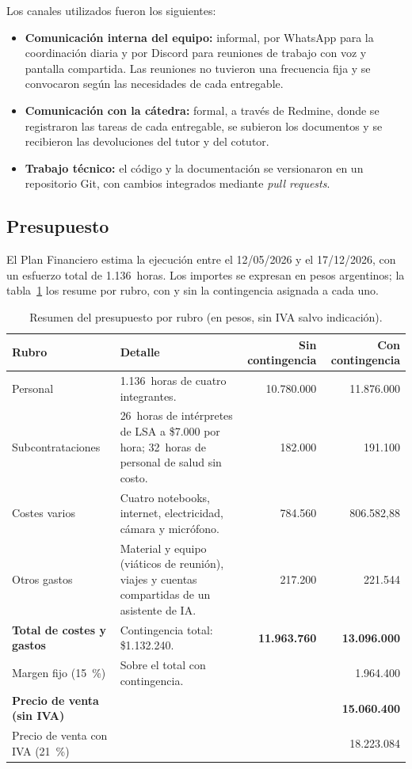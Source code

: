 Los canales utilizados fueron los siguientes:
\begin{itemize}
  \item \textbf{Comunicación interna del equipo:} informal, por WhatsApp para la coordinación diaria y por Discord para reuniones de trabajo con voz y pantalla compartida. Las reuniones no tuvieron una frecuencia fija y se convocaron según las necesidades de cada entregable.
  \item \textbf{Comunicación con la cátedra:} formal, a través de Redmine, donde se registraron las tareas de cada entregable, se subieron los documentos y se recibieron las devoluciones del tutor y del cotutor.
  \item \textbf{Trabajo técnico:} el código y la documentación se versionaron en un repositorio Git, con cambios integrados mediante \emph{pull requests}.
\end{itemize}

\subsection{Presupuesto}

El Plan Financiero estima la ejecución entre el 12/05/2026 y el 17/12/2026, con un esfuerzo total de 1.136~horas. Los importes se expresan en pesos argentinos; la tabla~\ref{tab:presupuesto} los resume por rubro, con y sin la contingencia asignada a cada uno.

\begin{table}[htbp]
\centering
\caption{Resumen del presupuesto por rubro (en pesos, sin IVA salvo indicación).}\label{tab:presupuesto}
\footnotesize
\begin{tabularx}{\textwidth}{@{}p{3.0cm}Xrr@{}}
\toprule
\textbf{Rubro} & \textbf{Detalle} & \textbf{Sin contingencia} & \textbf{Con contingencia} \\
\midrule
Personal & 1.136~horas de cuatro integrantes. & 10.780.000 & 11.876.000 \\
Subcontrataciones & 26~horas de intérpretes de LSA a \$7.000 por hora; 32~horas de personal de salud sin costo. & 182.000 & 191.100 \\
Costes varios & Cuatro notebooks, internet, electricidad, cámara y micrófono. & 784.560 & 806.582,88 \\
Otros gastos & Material y equipo (viáticos de reunión), viajes y cuentas compartidas de un asistente de IA. & 217.200 & 221.544 \\
\midrule
\textbf{Total de costes y gastos} & Contingencia total: \$1.132.240. & \textbf{11.963.760} & \textbf{13.096.000} \\
Margen fijo (15~\%) & Sobre el total con contingencia. & & 1.964.400 \\
\textbf{Precio de venta (sin IVA)} & & & \textbf{15.060.400} \\
Precio de venta con IVA (21~\%) & & & 18.223.084 \\
\bottomrule
\end{tabularx}
\end{table}

